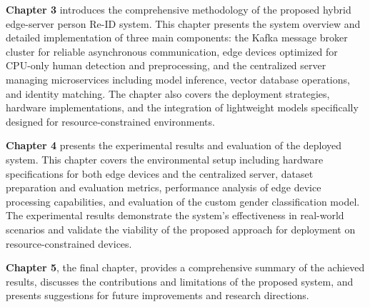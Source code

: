 \documentclass[../main.tex]{subfiles}
\begin{document}
\textbf{Chapter 3} introduces the comprehensive methodology of the proposed hybrid edge-server person Re-ID system. This chapter presents the system overview and detailed implementation of three main components: the Kafka message broker cluster for reliable asynchronous communication, edge devices optimized for CPU-only human detection and preprocessing, and the centralized server managing microservices including model inference, vector database operations, and identity matching. The chapter also covers the deployment strategies, hardware implementations, and the integration of lightweight models specifically designed for resource-constrained environments.

\textbf{Chapter 4} presents the experimental results and evaluation of the deployed system. This chapter covers the environmental setup including hardware specifications for both edge devices and the centralized server, dataset preparation and evaluation metrics, performance analysis of edge device processing capabilities, and evaluation of the custom gender classification model. The experimental results demonstrate the system's effectiveness in real-world scenarios and validate the viability of the proposed approach for deployment on resource-constrained devices.

\textbf{Chapter 5}, the final chapter, provides a comprehensive summary of the achieved results, discusses the contributions and limitations of the proposed system, and presents suggestions for future improvements and research directions.
\end{document}
